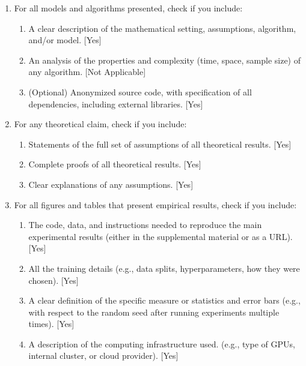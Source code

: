 \documentclass[twoside]{article}
\begin{document}
\begin{enumerate}

  \item For all models and algorithms presented, check if you include:
  \begin{enumerate}
    \item A clear description of the mathematical setting, assumptions, algorithm, and/or model. [Yes]
    \item An analysis of the properties and complexity (time, space, sample size) of any algorithm. [Not Applicable]
    \item (Optional) Anonymized source code, with specification of all dependencies, including external libraries. [Yes]
  \end{enumerate}

  \item For any theoretical claim, check if you include:
  \begin{enumerate}
    \item Statements of the full set of assumptions of all theoretical results. [Yes]
    \item Complete proofs of all theoretical results. [Yes]
    \item Clear explanations of any assumptions. [Yes]     
  \end{enumerate}

  \item For all figures and tables that present empirical results, check if you include:
  \begin{enumerate}
    \item The code, data, and instructions needed to reproduce the main experimental results (either in the supplemental material or as a URL). [Yes]
    \item All the training details (e.g., data splits, hyperparameters, how they were chosen). [Yes]
    \item A clear definition of the specific measure or statistics and error bars (e.g., with respect to the random seed after running experiments multiple times). [Yes]
    \item A description of the computing infrastructure used. (e.g., type of GPUs, internal cluster, or cloud provider). [Yes]
  \end{enumerate}


\end{enumerate}
\end{document}
